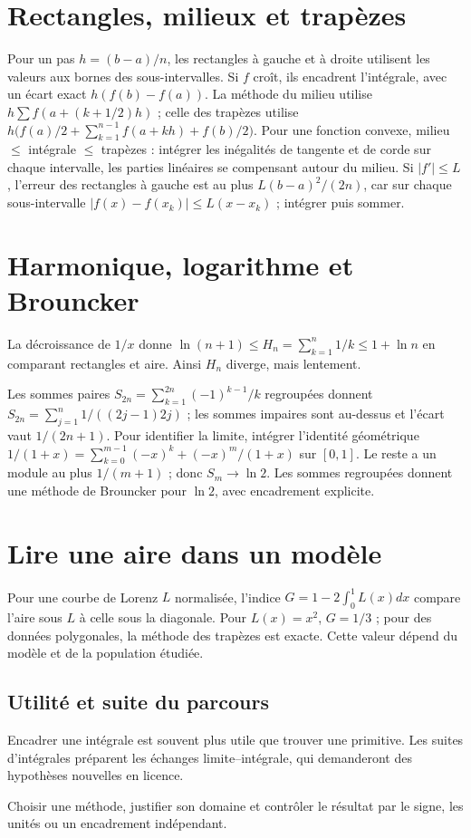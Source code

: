 \documentclass[../cours_tle.tex]{subfiles}
\begin{document}
\section{Rectangles, milieux et trapèzes}
Pour un pas $h=(b-a)/n$, les rectangles à gauche et à droite utilisent les valeurs aux bornes des sous-intervalles. Si $f$ croît, ils encadrent l'intégrale, avec un écart exact $h(f(b)-f(a))$.
La méthode du milieu utilise $h\sum f(a+(k+1/2)h)$ ; celle des trapèzes utilise
$h\bigl(f(a)/2+\sum_{k=1}^{n-1}f(a+kh)+f(b)/2\bigr)$.
Pour une fonction convexe, milieu $\le$ intégrale $\le$ trapèzes : intégrer les inégalités de tangente et de corde sur chaque intervalle, les parties linéaires se compensant autour du milieu.
Si $|f'|\le L$, l'erreur des rectangles à gauche est au plus $L(b-a)^2/(2n)$, car sur chaque sous-intervalle $|f(x)-f(x_k)|\le L(x-x_k)$ ; intégrer puis sommer.
\section{Harmonique, logarithme et Brouncker}
La décroissance de $1/x$ donne
$\ln(n+1)\le H_n=\sum_{k=1}^n1/k\le1+\ln n$ en comparant rectangles et aire.
Ainsi $H_n$ diverge, mais lentement.

Les sommes paires $S_{2n}=\sum_{k=1}^{2n}(-1)^{k-1}/k$ regroupées donnent
$S_{2n}=\sum_{j=1}^n1/((2j-1)2j)$ ; les sommes impaires sont au-dessus et l'écart vaut $1/(2n+1)$.
Pour identifier la limite, intégrer l'identité géométrique
$1/(1+x)=\sum_{k=0}^{m-1}(-x)^k+(-x)^m/(1+x)$ sur $[0,1]$.
Le reste a un module au plus $1/(m+1)$ ; donc $S_m\to\ln2$.
Les sommes regroupées donnent une méthode de Brouncker pour $\ln2$, avec encadrement explicite.
\section{Lire une aire dans un modèle}
Pour une courbe de Lorenz $L$ normalisée, l'indice $G=1-2\int_0^1L(x)dx$ compare l'aire sous $L$ à celle sous la diagonale. Pour $L(x)=x^2$, $G=1/3$ ; pour des données polygonales, la méthode des trapèzes est exacte. Cette valeur dépend du modèle et de la population étudiée.
\begin{finchapitre}
\section{Utilité et suite du parcours}
Encadrer une intégrale est souvent plus utile que trouver une primitive. Les suites d'intégrales préparent les échanges limite–intégrale, qui demanderont des hypothèses nouvelles en licence.
\begin{retenir}
Choisir une méthode, justifier son domaine et contrôler le résultat par le signe, les unités ou un encadrement indépendant.
\end{retenir}
\end{finchapitre}
\end{document}
